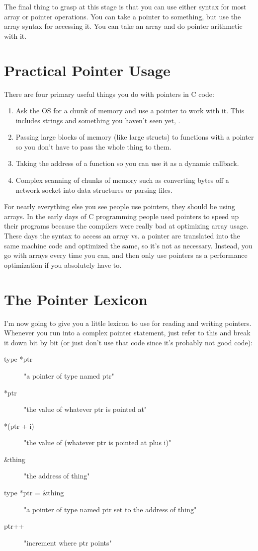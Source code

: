 The final thing to grasp at this stage is that you can use either syntax
for most array or pointer operations.  You can take a pointer to something,
but use the array syntax for accessing it.  You can take an array and do
pointer arithmetic with it. 

\section{Practical Pointer Usage}

There are four primary useful things you do with pointers in C code:

\begin{enumerate}
\item Ask the OS for a chunk of memory and use a pointer
    to work with it.  This includes strings and something you haven't seen
    yet, .
\item Passing large blocks of memory (like large structs) to functions
    with a pointer so you don't have to pass the whole thing to them.
\item Taking the address of a function so you can use it as a dynamic callback.
\item Complex scanning of chunks of memory such as converting bytes off a network
    socket into data structures or parsing files.
\end{enumerate}

For nearly everything else you see people use pointers, they should be using
arrays.  In the early days of C programming people used pointers to speed
up their programs because the compilers were really bad at optimizing array 
usage.  These days the syntax to access an array vs. a pointer are translated
into the same machine code and optimized the same, so it's not as necessary.
Instead, you go with arrays every time you can, and then only use pointers
as a performance optimization if you absolutely have to.


\section{The Pointer Lexicon}

I'm now going to give you a little lexicon to use for reading and writing
pointers.  Whenever you run into a complex pointer statement, just refer
to this and break it down bit by bit (or just don't use that code since it's
probably not good code):

\begin{description}
\item[type *ptr] "a pointer of type named ptr"
\item[*ptr] "the value of whatever ptr is pointed at"
\item[*(ptr + i)] "the value of (whatever ptr is pointed at plus i)"
\item[\&thing] "the address of thing"
\item[type *ptr = \&thing] "a pointer of type named ptr set to the address of thing"
\item[ptr++] "increment where ptr points"
\end{description}

